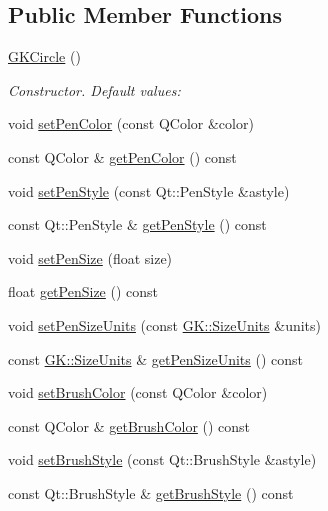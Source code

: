 \subsection*{Public Member Functions}
\begin{DoxyCompactItemize}
\item 
\hyperlink{classGKCircle_ac8773f84e358b70ef1f26adbce1e047e}{G\+K\+Circle} ()
\begin{DoxyCompactList}\small\item\em Constructor. Default values\+: \end{DoxyCompactList}\item 
void \hyperlink{classGKCircle_a24899c7875caed4c452ec6b9fd52d5a6}{set\+Pen\+Color} (const Q\+Color \&color)
\item 
const Q\+Color \& \hyperlink{classGKCircle_a934b4b2fccce3683aff98cfea8a47f25}{get\+Pen\+Color} () const 
\item 
void \hyperlink{classGKCircle_acc101fb7fffe59c7901340c67bf737f4}{set\+Pen\+Style} (const Qt\+::\+Pen\+Style \&astyle)
\item 
const Qt\+::\+Pen\+Style \& \hyperlink{classGKCircle_a93722085db829db84504aff914ea847b}{get\+Pen\+Style} () const 
\item 
void \hyperlink{classGKCircle_ae368ef101c9d3160836d52fc9817b4bc}{set\+Pen\+Size} (float size)
\item 
float \hyperlink{classGKCircle_a0c84de99ad24d9ba95111e934cdfa5d3}{get\+Pen\+Size} () const 
\item 
void \hyperlink{classGKCircle_a9c6c59618f5ea6ad78bce94cf0cc260e}{set\+Pen\+Size\+Units} (const \hyperlink{namespaceGK_adde45307f3be11d926c291a749271263}{G\+K\+::\+Size\+Units} \&units)
\item 
const \hyperlink{namespaceGK_adde45307f3be11d926c291a749271263}{G\+K\+::\+Size\+Units} \& \hyperlink{classGKCircle_aec301a3b9027976a9f1a04c7e83a9e58}{get\+Pen\+Size\+Units} () const 
\item 
void \hyperlink{classGKCircle_af6f55ceedaad054ba9c1344be5e36e95}{set\+Brush\+Color} (const Q\+Color \&color)
\item 
const Q\+Color \& \hyperlink{classGKCircle_a9891dcb030190339cf003c96bf0a0b7a}{get\+Brush\+Color} () const 
\item 
void \hyperlink{classGKCircle_a10fd31dc02b93b59fcccb24affd01974}{set\+Brush\+Style} (const Qt\+::\+Brush\+Style \&astyle)
\item 
const Qt\+::\+Brush\+Style \& \hyperlink{classGKCircle_aed80d8e34b178d54e32f6749e1714357}{get\+Brush\+Style} () const 

\end{DoxyCompactItemize}
